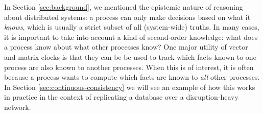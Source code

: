 \documentclass[]             %
{NASA}                       %
\theoremstyle{definition}
\begin{document}
In Section \ref{sec:background}, we mentioned the epistemic nature of
reasoning about distributed systems: a process can only make decisions
based on what it \emph{knows}, which is usually a strict subset of all
(system-wide) truths. In many cases, it is important to take into
account a kind of second-order knowledge: what does a process know
about what other processes know? One major utility of vector and
matrix clocks is that they can be be used to track which facts known
to one process are also known to another processes. When this is of
interest, it is often because a process wants to compute which facts
are known to \emph{all} other processes. In Section
\ref{sec:continuous-consistency} we will see an example of how this
works in practice in the context of replicating a database over a
disruption-heavy network.

\end{document}
